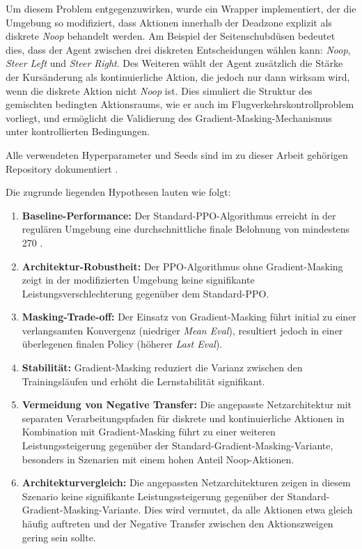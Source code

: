 Um diesem Problem entgegenzuwirken, wurde ein Wrapper implementiert, der die Umgebung so modifiziert, dass Aktionen innerhalb der Deadzone explizit als diskrete \emph{Noop} behandelt werden. Am Beispiel der Seitenschubdüsen bedeutet dies, dass der Agent zwischen drei diskreten Entscheidungen wählen kann: \emph{Noop}, \emph{Steer Left}  und \emph{Steer Right}. Des Weiteren wählt der Agent zusätzlich die Stärke der Kursänderung als kontinuierliche Aktion, die jedoch nur dann wirksam wird, wenn die diskrete Aktion nicht \emph{Noop} ist. 
Dies simuliert die Struktur des gemischten bedingten Aktionsraums, wie er auch im Flugverkehrskontrollproblem vorliegt, und ermöglicht die Validierung des Gradient-Masking-Mechanismus unter kontrollierten Bedingungen.
\medskip

Alle verwendeten Hyperparameter und Seeds sind im zu dieser Arbeit gehörigen Repository dokumentiert \cite{meinCode}.
\medskip

Die zugrunde liegenden Hypothesen lauten wie folgt:
\begin{enumerate}
    \item \label{hyp:baseline} \textbf{Baseline-Performance:} Der Standard-\ac{PPO}-Algorithmus erreicht in der regulären Umgebung eine durchschnittliche finale Belohnung von mindestens 270 \cite{algo_score_reference}.
    \item \label{hyp:no_masking} \textbf{Architektur-Robustheit:} Der \ac{PPO}-Algorithmus ohne Gradient\hyp{}Masking zeigt in der modifizierten Umgebung keine signifikante Leistungsverschlechterung gegenüber dem Standard-\ac{PPO}.
    \item \label{hyp:convergence} \textbf{Masking-Trade-off:} Der Einsatz von Gradient\hyp{}Masking führt initial zu einer verlangsamten Konvergenz (niedriger \emph{Mean Eval}), resultiert jedoch in einer überlegenen finalen Policy (höherer \emph{Last Eval}).
    \item \label{hyp:stability} \textbf{Stabilität:} Gradient\hyp{}Masking reduziert die Varianz zwischen den Trainingsläufen und erhöht die Lernstabilität signifikant.
    \item \label{hyp:Interferenzen} \textbf{Vermeidung von Negative Transfer:} Die angepasste Netzarchitektur mit separaten Verarbeitungspfaden für diskrete und kontinuierliche Aktionen in Kombination mit Gradient\hyp{}Masking führt zu einer weiteren Leistungssteigerung gegenüber der Standard-Gradient\hyp{}Masking-Variante, besonders in Szenarien mit einem hohen Anteil Noop\hyp{}Aktionen.
    \item \label{hyp:Netzarchitektur} \textbf{Architekturvergleich:} Die angepassten Netzarchitekturen zeigen in diesem Szenario keine signifikante Leistungssteigerung gegenüber der Standard-Gradient\hyp{}Masking-Variante. Dies wird vermutet, da alle Aktionen etwa gleich häufig auftreten und der Negative Transfer zwischen den Aktionszweigen gering sein sollte. 
\end{enumerate}

